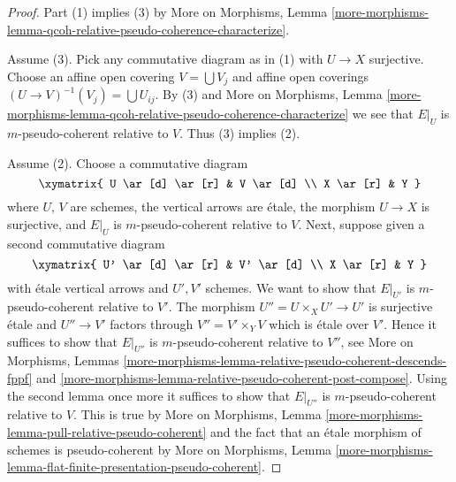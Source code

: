 \begin{proof}
Part (1) implies (3) by More on Morphisms, Lemma
\ref{more-morphisms-lemma-qcoh-relative-pseudo-coherence-characterize}.

\medskip\noindent
Assume (3). Pick any commutative diagram as in (1) with $U \to X$ surjective.
Choose an affine open covering $V = \bigcup V_j$ and affine open coverings
$(U \to V)^{-1}(V_j) = \bigcup U_{ij}$. By (3) and More on Morphisms, Lemma
\ref{more-morphisms-lemma-qcoh-relative-pseudo-coherence-characterize}
we see that $E|_U$ is $m$-pseudo-coherent relative to $V$.
Thus (3) implies (2).

\medskip\noindent
Assume (2). Choose a commutative diagram
$$
\xymatrix{
U \ar[d] \ar[r] & V \ar[d] \\
X \ar[r] & Y
}
$$
where $U$, $V$ are schemes, the vertical arrows are \'etale, the
morphism $U \to X$ is surjective, and $E|_U$ is $m$-pseudo-coherent
relative to $V$. Next, suppose given a second commutative diagram
$$
\xymatrix{
U' \ar[d] \ar[r] & V' \ar[d] \\
X \ar[r] & Y
}
$$
with \'etale vertical arrows and $U', V'$ schemes. We want to show
that $E|_{U'}$ is $m$-pseudo-coherent relative to $V'$.
The morphism $U'' = U \times_X U' \to U'$ is surjective \'etale
and $U'' \to V'$ factors through $V'' = V' \times_Y V$ which
is \'etale over $V'$. Hence it suffices to show that $E|_{U''}$
is $m$-pseudo-coherent relative to $V''$, see
More on Morphisms, Lemmas
\ref{more-morphisms-lemma-relative-pseudo-coherent-descends-fppf} and
\ref{more-morphisms-lemma-relative-pseudo-coherent-post-compose}.
Using the second lemma once more it suffices to show that
$E|_{U''}$ is $m$-pseudo-coherent relative to $V$.
This is true by More on Morphisms, Lemma
\ref{more-morphisms-lemma-pull-relative-pseudo-coherent}
and the fact that an \'etale morphism of schemes is pseudo-coherent by
More on Morphisms, Lemma
\ref{more-morphisms-lemma-flat-finite-presentation-pseudo-coherent}.
\end{proof}

